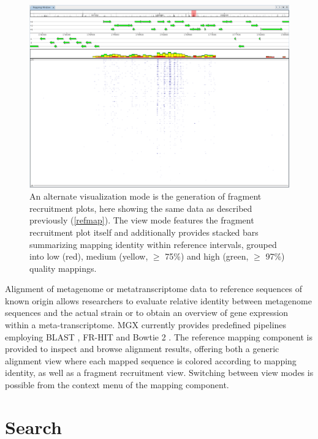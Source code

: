 \begin{figure}[H]
\centering
\includegraphics[width=\textwidth]{img/mgx/FragRecruitment}
\caption[Fragment recruitment]{An alternate visualization mode is the generation of fragment recruitment plots, here showing the
same data as described previously (\ref{refmap}). The view mode features the fragment recruitment plot itself and additionally
provides stacked bars summarizing mapping identity within reference intervals, grouped into low (red), medium (yellow, $\ge$ 75\%) and
high (green, $\ge$ 97\%) quality mappings.}
\label{fragrec}
\end{figure}


Alignment of metagenome or metatranscriptome data to reference sequences of known origin allows researchers to evaluate
relative identity between metagenome sequences and the actual strain or to obtain an overview of gene expression within
a meta-transcriptome. MGX currently provides predefined pipelines employing BLAST \cite{BLAST}, FR-HIT \cite{FRHIT} and Bowtie 2 \cite{BOWTIE}.
The reference mapping component is provided to inspect and browse alignment results, offering both a generic alignment view
where each mapped sequence is colored according to mapping identity, as well as a fragment recruitment view. Switching between
view modes is possible from the context menu of the mapping component.

\section{Search}

